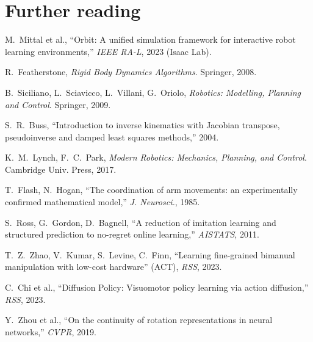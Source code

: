 \documentclass[10pt,a4paper]{article}
\begin{document}
\section*{Further reading}
\begin{small}
\begin{enumerate}[label={[\arabic*]},leftmargin=2em]
\item M.~Mittal et al., ``Orbit: A unified simulation framework for interactive robot learning environments,'' \emph{IEEE RA-L}, 2023 (Isaac Lab).
\item R.~Featherstone, \emph{Rigid Body Dynamics Algorithms}. Springer, 2008.
\item B.~Siciliano, L.~Sciavicco, L.~Villani, G.~Oriolo, \emph{Robotics: Modelling, Planning and Control}. Springer, 2009.
\item S.~R.~Buss, ``Introduction to inverse kinematics with Jacobian transpose, pseudoinverse and damped least squares methods,'' 2004.
\item K.~M.~Lynch, F.~C.~Park, \emph{Modern Robotics: Mechanics, Planning, and Control}. Cambridge Univ. Press, 2017.
\item T.~Flash, N.~Hogan, ``The coordination of arm movements: an experimentally confirmed mathematical model,'' \emph{J. Neurosci.}, 1985.
\item S.~Ross, G.~Gordon, D.~Bagnell, ``A reduction of imitation learning and structured prediction to no-regret online learning,'' \emph{AISTATS}, 2011.
\item T.~Z.~Zhao, V.~Kumar, S.~Levine, C.~Finn, ``Learning fine-grained bimanual manipulation with low-cost hardware'' (ACT), \emph{RSS}, 2023.
\item C.~Chi et al., ``Diffusion Policy: Visuomotor policy learning via action diffusion,'' \emph{RSS}, 2023.
\item Y.~Zhou et al., ``On the continuity of rotation representations in neural networks,'' \emph{CVPR}, 2019.
\end{enumerate}
\end{small}
\end{document}
